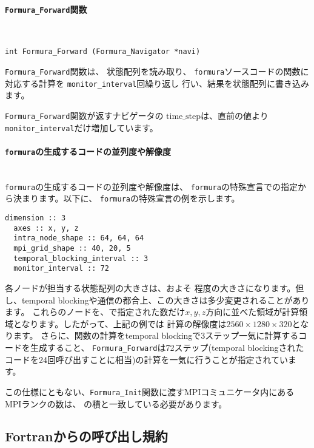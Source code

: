 \documentclass{jsarticle}
\newcommand{\formura}{{\texttt{formura}}}
\begin{document}
\paragraph{\texttt{Formura\_Forward}関数} \leavevmode\\

\begin{screen}
\begin{verbatim}
int Formura_Forward (Formura_Navigator *navi)
\end{verbatim}
\end{screen}
\verb`Formura_Forward`関数は、
状態配列を読み取り、
\formura ソースコードの関数に対応する計算を
\verb`monitor_interval`回繰り返し
行い、結果を状態配列に書き込みます。

 \verb`Formura_Forward`関数が返すナビゲータの
 $\mathrm{time\_step}$は、直前の値より
\verb`monitor_interval`だけ増加しています。

\paragraph{\formura の生成するコードの並列度や解像度} \leavevmode\\

\formura の生成するコードの並列度や解像度は、
\formura の特殊宣言での指定から決まります。以下に、
\formura の特殊宣言の例を示します。

\begin{lstlisting}[mathescape]
  dimension :: 3
  axes :: x, y, z
  intra_node_shape :: 64, 64, 64
  mpi_grid_shape :: 40, 20, 5
  temporal_blocking_interval :: 3
  monitor_interval :: 72
\end{lstlisting}

各ノードが担当する状態配列の大きさは、およそ
程度の大きさになります。但し、temporal blockingや通信の都合上、この大きさは多少変更されることがあります。
これらのノードを、で指定された数だけ$x,y,z$方向に並べた領域が計算領域となります。したがって、上記の例では
計算の解像度は$2560 \times 1280 \times 320$となります。
さらに、関数の計算をtemporal blockingで3ステップ一気に計算するコードを生成すること、
\verb`Formura_Forward`は72ステップ(temporal blockingされたコードを24回呼び出すことに相当)の計算を一気に行うことが指定されています。

この仕様にともない、\verb`Formura_Init`関数に渡すMPIコミュニケータ内にあるMPIランクの数は、
の積と一致している必要があります。


\subsection{Fortranからの呼び出し規約}
\end{document}
